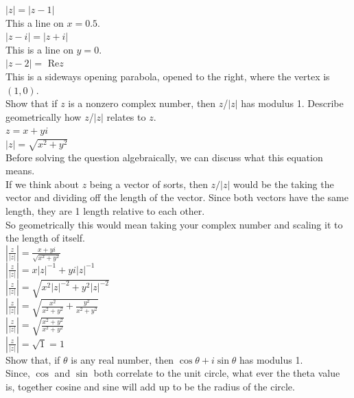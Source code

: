 \documentclass[12pt]{article}
\begin{document}
 $|z| = |z - 1|$\\
This a line on $x = 0.5$.\\

 $|z - i| = |z + i|$\\
This is a line on $y = 0$.\\

 $|z - 2| =$ Re$z$ \\
This is a sideways opening parabola, opened to the right, where the vertex is $(1,0)$.\\

 Show that if $z$ is a nonzero complex number, then $z$/$|z|$ has modulus 1. Describe geometrically how $z$/$|z|$ relates to $z$.\\
$z = x + yi$\\
$|z| = \sqrt{x^2 + y^2}$\\

Before solving the question algebraically, we can discuss what this equation means.\\
If we think about $z$ being a vector of sorts, then $z/|z|$ would be the taking the vector and dividing off the length of the vector. 
Since both vectors have the same length, they are 1 length relative to each other.\\
So geometrically this would mean taking your complex number and scaling it to the length of itself.\\

$|\frac{z}{|z|}| = \frac{x+yi}{\sqrt{x^2 + y^2}}$\\
$|\frac{z}{|z|}| = x|z|^{-1} + yi|z|^{-1}$\\
$|\frac{z}{|z|}| = \sqrt{x^2|z|^{-2} + y^2|z|^{-2}}$\\
$|\frac{z}{|z|}| = \sqrt{\frac{x^2}{x^2 + y^2} + \frac{y^2}{x^2 + y^2}}$\\
$|\frac{z}{|z|}| = \sqrt{\frac{x^2 + y^2}{x^2 + y^2}}$\\
$|\frac{z}{|z|}| = \sqrt{1} = 1$\\



 Show that, if $\theta$ is any real number, then $\cos\theta + i\sin\theta$ has modulus 1.\\

Since, $\cos$ and $\sin$ both correlate to the unit circle, what ever the theta value is, together cosine and sine will add up to be the radius of the circle.\\
\end{document}
